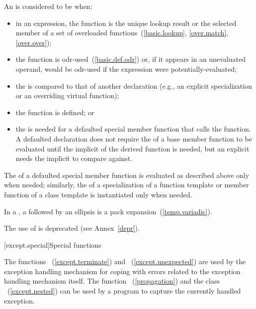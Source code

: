 \pnum
An  is considered to be  when:

\begin{itemize}
\item in an expression, the function is the unique lookup result or the selected
member of a set of overloaded functions~(\ref{basic.lookup}, \ref{over.match}, \ref{over.over});

\item the function is odr-used~(\ref{basic.def.odr}) or, if it appears in an
unevaluated operand, would be odr-used if the expression were
potentially-evaluated;

\item the  is compared to that of another
declaration (e.g., an explicit specialization or an overriding virtual
function);

\item the function is defined; or

\item the  is needed for a defaulted
special member function that calls the function.
\enternote A defaulted declaration does not require the
 of a base member function to be evaluated
until the implicit  of the derived
function is needed, but an explicit  needs
the implicit  to compare against.
\exitnote
\end{itemize}

The  of a defaulted special member
function is evaluated as described above only when needed; similarly, the
 of a specialization of a function
template or member function of a class template is instantiated only when
needed.



\pnum
In a , a
 followed by an ellipsis is a
pack expansion~(\ref{temp.variadic}).

\pnum
\enternote The use of  is deprecated
(see Annex~\ref{depr}). \exitnote%

[except.special]{Special functions}

\pnum
The functions ~(\ref{except.terminate}) and
~(\ref{except.unexpected}) are used by the exception
handling mechanism for coping with errors related to the exception handling
mechanism itself. The function
~(\ref{propagation}) and the class
~(\ref{except.nested}) can be used by a program to
capture the currently handled exception.

